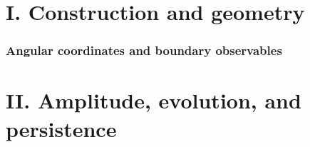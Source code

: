 
\clearpage
{\setlength{\parskip}{0pt}\fontsize{10}{12}\selectfont\tableofcontents}
\clearpage
\part*{I. Construction and geometry}

\clearpage
\clearpage

\clearpage


\clearpage

\clearpage
\clearpage


\clearpage


\clearpage

\clearpage

\clearpage

\clearpage

\clearpage
\section{Angular coordinates and boundary observables}

\clearpage

\clearpage

\clearpage


\clearpage

\clearpage

\clearpage

\clearpage

\clearpage

\clearpage

\clearpage
\part*{II. Amplitude, evolution, and persistence}

\clearpage

\clearpage

\clearpage

\clearpage

\clearpage

\clearpage

\clearpage

\clearpage

\clearpage
